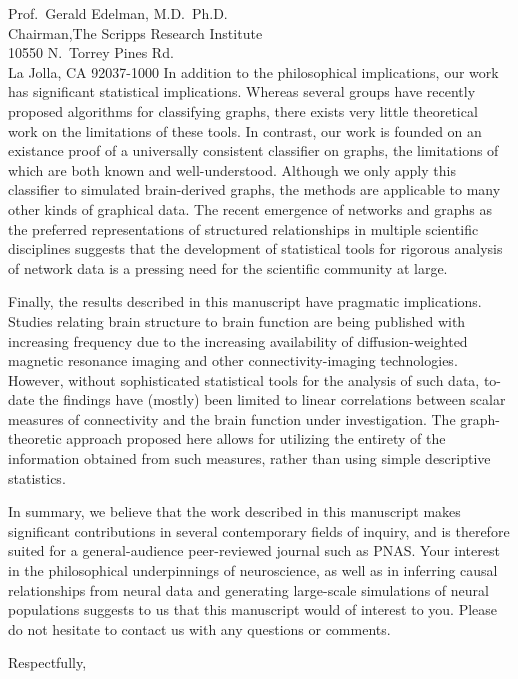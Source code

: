 \documentclass[10pt]{letter}
\begin{document}
\begin{letter}{	Prof.\ Gerald Edelman, M.D.\, Ph.D.\ \\
               	Chairman,The Scripps Research Institute \\
				10550 N.\ Torrey Pines Rd.\ \\
               	La Jolla, CA  92037-1000}
In addition to the philosophical implications, our work has significant
statistical implications.  Whereas several groups have recently proposed
algorithms for classifying graphs, there exists very little theoretical work on
the limitations of these tools.  In contrast, our work is founded on an
existance proof of a universally consistent classifier on graphs, the
limitations of which are both known and well-understood.  Although we only apply
this classifier to simulated brain-derived graphs, the methods are applicable to
many other kinds of graphical data. The recent emergence of networks and graphs 
as the preferred representations of structured relationships in multiple
scientific disciplines suggests that the development of statistical tools for
rigorous analysis of network data is a pressing need for the scientific
community at large.  

Finally, the results described in this manuscript have pragmatic implications.
Studies relating brain structure to brain function are being published with
increasing frequency due to the increasing availability of diffusion-weighted
magnetic resonance imaging and other connectivity-imaging technologies.  However,
without sophisticated statistical tools for the analysis of such data, to-date
the findings have (mostly) been limited to linear correlations between scalar
measures of connectivity and the brain function under investigation.  The
graph-theoretic approach proposed here allows for utilizing the entirety of the
information obtained from such measures, rather than using simple descriptive
statistics.

In summary, we believe that the work described in this manuscript makes
significant contributions in several contemporary fields of inquiry, and is
therefore suited for a general-audience peer-reviewed journal such as PNAS.  Your
interest in the philosophical underpinnings of neuroscience, as well as in
inferring causal relationships from neural data and generating large-scale
simulations of neural populations suggests to us that this manuscript would of
interest to you.  Please do not hesitate to contact us with any questions or
comments.

\closing{Respectfully,}



\end{letter}
\end{document}
